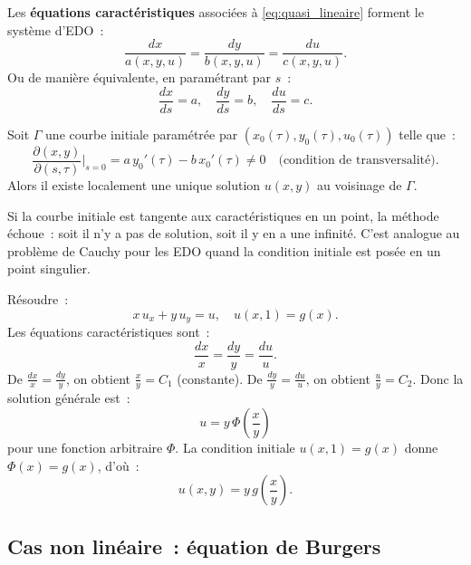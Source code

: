 \begin{definition}
Les \textbf{\'equations caract\'eristiques} associ\'ees \`a
\eqref{eq:quasi_lineaire} forment le syst\`eme d'EDO~:
\begin{equation}\label{eq:systeme_caract}
    \frac{dx}{a(x,y,u)} = \frac{dy}{b(x,y,u)} = \frac{du}{c(x,y,u)}.
\end{equation}
Ou de mani\`ere \'equivalente, en param\'etrant par $s$~:
\[
    \frac{dx}{ds} = a, \quad \frac{dy}{ds} = b, \quad \frac{du}{ds} = c.
\]
\end{definition}

\begin{theoreme}
Soit $\Gamma$ une courbe initiale param\'etr\'ee par
$(x_0(\tau), y_0(\tau), u_0(\tau))$ telle que~:
\[
    \frac{\partial(x,y)}{\partial(s,\tau)}\bigg|_{s=0}
    = a\, y_0'(\tau) - b\, x_0'(\tau) \neq 0
    \quad \text{(condition de transversalit\'e)}.
\]
Alors il existe localement une unique solution $u(x,y)$ au voisinage
de $\Gamma$.
\end{theoreme}

\begin{attention}[title=\textbf{Condition de transversalit\'e}]
Si la courbe initiale est tangente aux caract\'eristiques en un point,
la m\'ethode \'echoue~: soit il n'y a pas de solution, soit il y en a
une infinit\'e. C'est analogue au probl\`eme de Cauchy pour les EDO quand
la condition initiale est pos\'ee en un point singulier.
\end{attention}

\begin{exemple}
R\'esoudre~:
\[
    x\, u_x + y\, u_y = u, \quad u(x,1) = g(x).
\]
Les \'equations caract\'eristiques sont~:
\[
    \frac{dx}{x} = \frac{dy}{y} = \frac{du}{u}.
\]
De $\frac{dx}{x} = \frac{dy}{y}$, on obtient $\frac{x}{y} = C_1$
(constante). De $\frac{dy}{y} = \frac{du}{u}$, on obtient
$\frac{u}{y} = C_2$. Donc la solution g\'en\'erale est~:
\[
    u = y\, \Phi\!\left(\frac{x}{y}\right)
\]
pour une fonction arbitraire $\Phi$. La condition initiale $u(x,1) = g(x)$
donne $\Phi(x) = g(x)$, d'o\`u~:
\[
    u(x,y) = y\, g\!\left(\frac{x}{y}\right).
\]
\end{exemple}

\subsection{Cas non lin\'eaire~: \'equation de Burgers}

